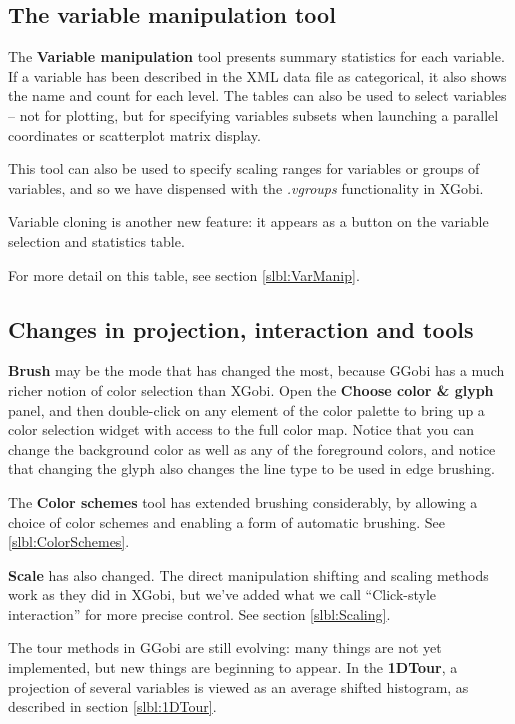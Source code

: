 \documentclass[11pt]{article}
\def\Widget#1{\textbf{#1}}
\begin{document}
{\subsection {The variable manipulation tool}

The \Widget{Variable manipulation} tool presents summary statistics for
each variable.  If a variable has been described in the XML data file
as categorical, it also shows the name and count for each level.
The tables can also be used to select variables -- not for plotting, but
for specifying variables subsets when launching a parallel coordinates
or scatterplot matrix display.

This tool can also be used to specify scaling ranges for variables or
groups of variables, and so we have dispensed with the {\em .vgroups}
functionality in XGobi.

Variable cloning is another new feature: it appears as a button
on the variable selection and statistics table.

For more detail on this table, see section \ref{slbl:VarManip}.

\subsection{Changes in projection, interaction and tools}

\Widget{Brush} may be the mode that has changed the most,
because GGobi has a much richer notion of color selection than
XGobi.  Open the \Widget{Choose color \& glyph} panel, and then
double-click on any element of the color palette to bring up a color
selection widget with access to the full color map.  Notice that you
can change the background color as well as any of the foreground
colors, and notice that changing the glyph also changes the line
type to be used in edge brushing.

The \Widget{Color schemes} tool has extended brushing considerably,
by allowing a choice of color schemes and enabling a form of
automatic brushing.  See \ref{slbl:ColorSchemes}.

\Widget{Scale} has also changed.  The direct manipulation shifting and
scaling methods work as they did in XGobi, but we've added what we
call ``Click-style interaction'' for more precise control.  See section
\ref{slbl:Scaling}.

The tour methods in GGobi are still evolving: many things are not yet
implemented, but new things are beginning to appear.  In the
\Widget{1DTour}, a projection of several variables is viewed as an
average shifted histogram, as described in section \ref{slbl:1DTour}.

}
\end{document}
